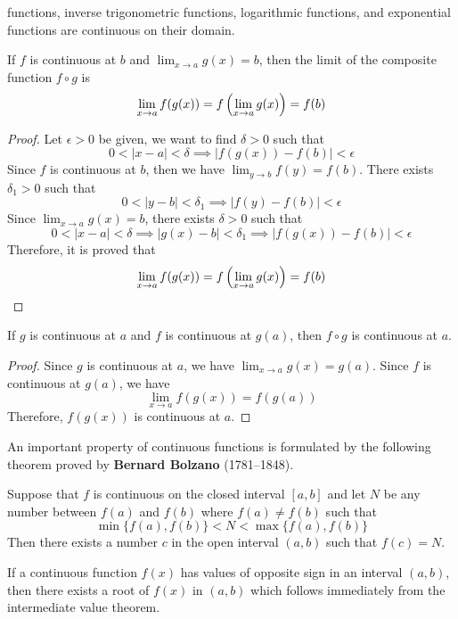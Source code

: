 functions, inverse trigonometric functions, logarithmic functions, and
exponential functions are continuous on their domain.
\begin{theorem}
    If \(f\) is continuous at \(b\) and \(\lim_{x\to a}g(x)=b\), then
    the limit of the composite function \(f\circ g\) is
    \[\lim_{x\to a}f(g(x))=f\left(\lim_{x\to a}g(x)\right)=f(b) \qedhere\]
\end{theorem}
\begin{proof}
    Let \(\epsilon>0\) be given, we want to find \(\delta>0\) such that
    \[0<|x-a|<\delta\implies|f(g(x))-f(b)|<\epsilon\]
    Since \(f\) is continuous at \(b\),
    then we have \(\lim_{y\to b}f(y)=f(b)\).
    There exists \(\delta_1>0\) such that
    \[0<|y-b|<\delta_1\implies|f(y)-f(b)|<\epsilon\]
    Since \(\lim_{x\to a}g(x)=b\), there exists \(\delta>0\) such that
    \[0<|x-a|<\delta\implies|g(x)-b|<\delta_1\implies|f(g(x))-f(b)|<\epsilon\]
    Therefore, it is proved that
    \[\lim_{x\to a}f(g(x))=f\left(\lim_{x\to a}g(x)\right)=f(b) \qedhere\]
\end{proof}
\begin{theorem}
    If \(g\) is continuous at \(a\) and \(f\) is continuous at \(g(a)\), then
    \(f\circ g\) is continuous at \(a\).
\end{theorem}
\begin{proof}
    Since \(g\) is continuous at \(a\), we have \(\lim_{x\to a}g(x)=g(a)\).
    Since \(f\) is continuous at \(g(a)\), we have
    \[\lim_{x\to a}f(g(x))=f(g(a))\]
    Therefore, \(f(g(x))\) is continuous at \(a\).
\end{proof}
An important property of continuous functions is formulated by the following
theorem proved by \textbf{Bernard Bolzano} (1781--1848).
\begin{theorem}
    Suppose that \(f\) is continuous on the closed interval \([a,b]\) and let
    \(N\) be any number between \(f(a)\) and \(f(b)\) where \(f(a)\neq f(b)\)
    such that \[\min\{f(a),f(b)\}<N<\max\{f(a),f(b)\}\]
    Then there exists a number \(c\) in the open interval \((a,b)\) such that
    \(f(c)=N\).
\end{theorem}
If a continuous function \(f(x)\) has values of opposite sign in an interval
\((a,b)\), then there exists a root of \(f(x)\) in \((a,b)\) which follows
immediately from the intermediate value theorem.